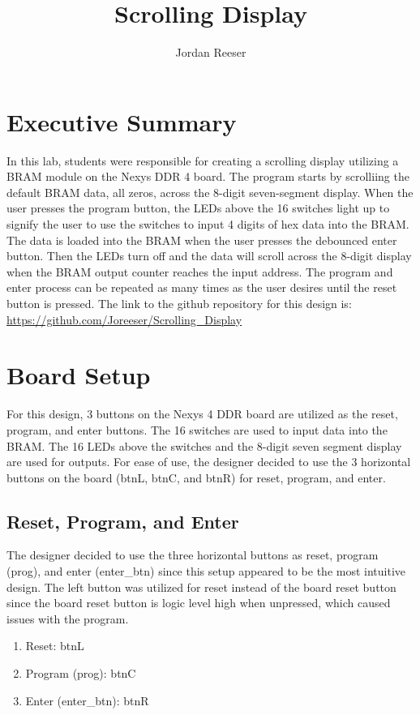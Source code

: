 \documentclass{article}
\author{Jordan Reeser}
\title{Scrolling Display}
\begin{document}
\maketitle

\section{Executive Summary}
In this lab, students were responsible for creating a scrolling display utilizing a BRAM module on the Nexys DDR 4 board. The program starts by scrolliing the default BRAM data, all zeros, across the 8-digit seven-segment display. When the user presses the program button, the LEDs above the 16 switches light up to signify the user to use the switches to input 4 digits of hex data into the BRAM. The data is loaded into the BRAM when the user presses the debounced enter button. Then the LEDs turn off and the data will scroll across the 8-digit display when the BRAM output counter reaches the input address. The program and enter process can be repeated as many times as the user desires until the reset button is pressed. The link to the github repository for this design is: \url{https://github.com/Joreeser/Scrolling_Display}

\section{Board Setup}
For this design, 3 buttons on the Nexys 4 DDR board are utilized as the reset, program, and enter buttons. The 16 switches are used to input data into the BRAM. The 16 LEDs above the switches and the 8-digit seven segment display are used for outputs. For ease of use, the designer decided to use the 3 horizontal buttons on the board (btnL, btnC, and btnR) for reset, program, and enter.

\subsection{Reset, Program, and Enter}
The designer decided to use the three horizontal buttons as reset, program (prog), and enter (enter\_btn) since this setup appeared to be the most intuitive design. The left button was utilized for reset instead of the board reset button since the board reset button is logic level high when unpressed, which caused issues with the program.
\begin{enumerate}
	\item Reset: btnL
	\item Program (prog): btnC
	\item Enter (enter\_btn): btnR
\end{enumerate} 
\end{document}
